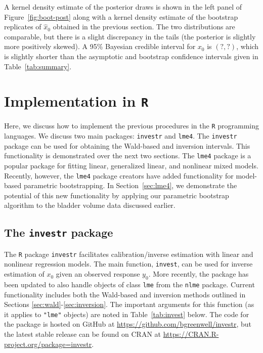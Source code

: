 \documentclass{article}\usepackage[]{graphicx}\usepackage[]{color}
\begin{document}
A kernel density estimate of the posterior draws is shown in the left panel of Figure~\ref{fig:boot-post} along with a kernel density estimate of the bootstrap replicates of $\widehat{x}_0$ obtained in the previous section.  The two distributions are comparable, but there is a slight discrepancy in the tails (the posterior is slightly more positively skewed).  A 95\% Bayesian credible interval for $x_0$ is $(?, ?)$, which is slightly shorter than the asymptotic and bootstrap confidence intervals given in Table~\ref{tab:summary}.


\section[Implementation in R]{Implementation in \texttt{R}}
\label{sec:implementation}

Here, we discuss how to implement the previous procedures in the \texttt{R} programming languages.  We discuss two main packages: \texttt{investr} and \texttt{lme4}.  The \texttt{investr} package can be used for obtaining the Wald-based and inversion intervals.  This functionality is demonstrated over the next two sections.  The \texttt{lme4} package is a popular package for fitting linear, generalized linear, and nonlinear mixed models. Recently, however, the \texttt{lme4} package creators have added functionality for model-based parametric bootstrapping.  In Section~\ref{sec:lme4}, we demonstrate the potential of this new functionality by applying our parametric bootstrap algorithm to the bladder volume data discussed earlier.



\subsection[The investr package]{The \texttt{investr} package}
The \texttt{R} package \texttt{investr} facilitates calibration/inverse estimation with linear and nonlinear regression models.  The main function, \texttt{invest}, can be used for inverse estimation of $x_0$ given an observed response $y_0$.  More recently, the package has been updated to also handle objects of class \texttt{lme} from the \texttt{nlme} package.  Current functionality includes both the Wald-based and inversion methods outlined in Sections \ref{sec:wald}-\ref{sec:inversion}.  The important arguments for this function (as it applies to \texttt{"lme"} objects) are noted in Table~\ref{tab:invest} below.  The code for the package is hosted on GitHub at \url{https://github.com/bgreenwell/investr}, but the latest stable release can be found on CRAN at \url{https://CRAN.R-project.org/package=investr}.
\end{document}
